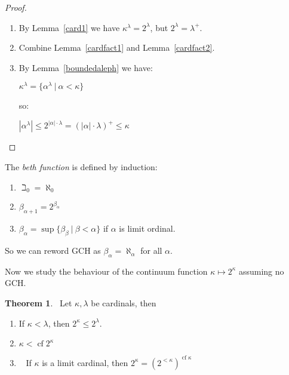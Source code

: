 \documentclass[8pt]{article}
\theoremstyle{definition}
\theoremstyle{definition}
\newtheorem{theorem}{Theorem}[section]
\theoremstyle{definition}
\theoremstyle{definition}
\theoremstyle{definition}
\theoremstyle{definition}
\theoremstyle{definition}
\theoremstyle{definition}
\theoremstyle{definition}
\theoremstyle{definition}
\theoremstyle{definition}
\theoremstyle{definition}
\theoremstyle{definition}
\theoremstyle{definition}
\theoremstyle{question}
\begin{document}
\begin{proof}
$ $

\begin{enumerate}
  \item By Lemma~\ref{card1} we have $\kappa^{\lambda} = 2^{\lambda}$, but $2^{\lambda} = \lambda^{+}$.
  \item Combine Lemma~\ref{cardfact1} and Lemma~\ref{cardfact2}.
  \item By Lemma~\ref{boundedaleph} we have:
  \begin{center}
    $\kappa^{\lambda} = \{ \alpha^{\lambda} \: | \: \alpha < \kappa \}$
  \end{center}
  so:
  \begin{center}
    $|\alpha^{\lambda}| \leq 2^{|\alpha| \cdot \lambda} = (|\alpha| \cdot \lambda)^{+} \leq \kappa$
  \end{center}
\end{enumerate}
\end{proof}

The \emph{beth function} is defined by induction:
\begin{enumerate}
  \item $\beth_0 = \aleph_0$
  \item $\beta_{\alpha + 1} = 2^{\beta_{\alpha}}$
  \item $\beta_{\alpha} = \sup \{ \beta_{\beta} \: | \: \beta < \alpha \}$ if $\alpha$ is limit ordinal.
\end{enumerate}

So we can reword GCH as $\beta_{\alpha} = \aleph_{\alpha}$ for all $\alpha$.

Now we study the behaviour of the continuum function $\kappa \mapsto 2^{\kappa}$ assuming no GCH.

\begin{theorem}~\label{continuum:func} Let $\kappa, \lambda$ be cardinals, then

  \begin{enumerate}
    \item If $\kappa < \lambda$, then $2^{\kappa} \leq 2^{\lambda}$.
    \item $\kappa < \operatorname{cf} 2^{\kappa}$
    \item~\label{continuum:func:3} If $\kappa$ is a limit cardinal, then $2^{\kappa} = (2^{<\kappa})^{\operatorname{cf} \kappa}$
  \end{enumerate}
\end{theorem}
\end{document}
